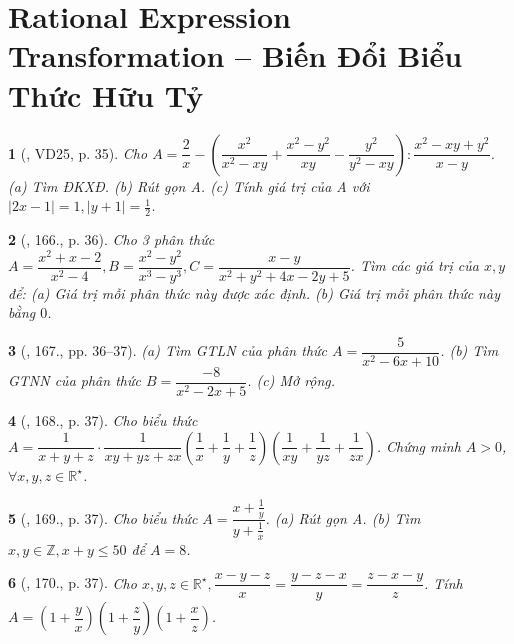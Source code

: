 \documentclass{article}
\newtheorem{baitoan}{}
\begin{document}

\section{Rational Expression Transformation -- Biến Đổi Biểu Thức Hữu Tỷ}

\begin{baitoan}[\cite{Tuyen_Toan_8}, VD25, p. 35]
	Cho $A = \dfrac{2}{x} - \left(\dfrac{x^2}{x^2 - xy} + \dfrac{x^2 - y^2}{xy} - \dfrac{y^2}{y^2 - xy}\right):\dfrac{x^2 - xy + y^2}{x - y}$. (a) Tìm {\rm ĐKXĐ}. (b) Rút gọn A. (c) Tính giá trị của A với $|2x - 1| = 1,|y + 1| = \frac{1}{2}$.
\end{baitoan}

\begin{baitoan}[\cite{Tuyen_Toan_8}, 166., p. 36]
	Cho 3 phân thức $A = \dfrac{x^2 + x - 2}{x^2 - 4},B = \dfrac{x^2 - y^2}{x^3 - y^3},C = \dfrac{x - y}{x^2 + y^2 + 4x - 2y + 5}$. Tìm các giá trị của $x,y$ để: (a) Giá trị mỗi phân thức này được xác định. (b) Giá trị mỗi phân thức này bằng $0$.
\end{baitoan}

\begin{baitoan}[\cite{Tuyen_Toan_8}, 167., pp. 36--37]
	(a) Tìm {\rm GTLN} của phân thức $A = \dfrac{5}{x^2 - 6x + 10}$. (b) Tìm {\rm GTNN} của phân thức $B = \dfrac{-8}{x^2 - 2x + 5}$. (c) Mở rộng.
\end{baitoan}

\begin{baitoan}[\cite{Tuyen_Toan_8}, 168., p. 37]
	Cho biểu thức $A = \dfrac{1}{x + y + z}\cdot\dfrac{1}{xy + yz + zx}\left(\dfrac{1}{x} + \dfrac{1}{y} + \dfrac{1}{z}\right)\left(\dfrac{1}{xy} + \dfrac{1}{yz} + \dfrac{1}{zx}\right)$. Chứng minh $A > 0$, $\forall x,y,z\in\mathbb{R}^\star$.
\end{baitoan}

\begin{baitoan}[\cite{Tuyen_Toan_8}, 169., p. 37]
	Cho biểu thức $A = \dfrac{x + \frac{1}{y}}{y + \frac{1}{x}}$. (a) Rút gọn A. (b) Tìm $x,y\in\mathbb{Z},x + y\le50$ để $A = 8$.
\end{baitoan}

\begin{baitoan}[\cite{Tuyen_Toan_8}, 170., p. 37]
	Cho $x,y,z\in\mathbb{R}^\star,\dfrac{x - y - z}{x} = \dfrac{y - z - x}{y} = \dfrac{z - x - y}{z}$. Tính\\$A = \left(1 + \dfrac{y}{x}\right)\left(1 + \dfrac{z}{y}\right)\left(1 + \dfrac{x}{z}\right)$.
\end{baitoan}
\end{document}
